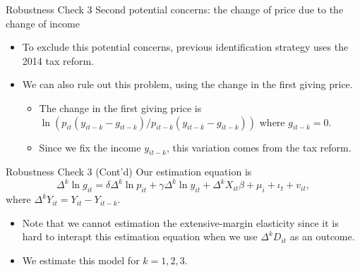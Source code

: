 \documentclass[
  ignorenonframetext,
  aspectratio=169,
]{beamer}
\providecommand{\tightlist}{%
  \setlength{\itemsep}{0pt}\setlength{\parskip}{0pt}}
\begin{document}
\begin{frame}{Robustness Check 3}
\protect\hypertarget{robustness-check-3}{}
Second potential concerns: the change of price due to the change of income

\begin{itemize}
\tightlist
\item
  To exclude this potential concerns, previous identification strategy uses the 2014 tax reform.
\item
  We can also rule out this problem, using the change in the first giving price.

  \begin{itemize}
  \tightlist
  \item
    The change in the first giving price is \(\ln(p_{it}(y_{it-k} - g_{it-k})/p_{it-k}(y_{it-k} - g_{it-k}))\) where \(g_{it-k} = 0\).
  \item
    Since we fix the income \(y_{it-k}\), this variation comes from the tax reform.
  \end{itemize}
\end{itemize}
\end{frame}

\begin{frame}{Robustness Check 3 (Cont'd)}
\protect\hypertarget{robustness-check-3-contd}{}
Our estimation equation is
\[\Delta^k \ln g_{it} = \delta \Delta^k \ln p_{it} + \gamma \Delta^k \ln y_{it} + \Delta^k X_{it} \beta + \mu_i + \iota_t + v_{it},\]
where \(\Delta^k Y_{it} = Y_{it} - Y_{it-k}\).

\begin{itemize}
\tightlist
\item
  Note that we cannot estimation the extensive-margin elasticity since it is hard to interapt this estimation equation when we use \(\Delta^k D_{it}\) as an outcome.
\item
  We estimate this model for \(k = 1, 2, 3\).
\end{itemize}
\end{frame}
\end{document}
